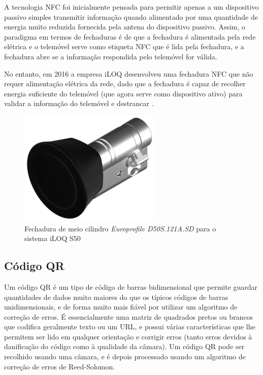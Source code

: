 \documentclass[11pt, a4paper, oneside]{book}
\begin{document}
A tecnologia NFC foi inicialmente pensada para permitir apenas a um dispositivo passivo simples transmitir informação quando alimentado por uma quantidade de energia muito reduzida fornecida pela antena do dispositivo passivo. Assim, o paradigma em termos de fechaduras é de que a fechadura é alimentada pela rede elétrica e o telemóvel serve como etiqueta NFC que é lida pela fechadura, e a fechadura abre se a informação respondida pelo telemóvel for válida.

No entanto, em 2016 a empresa iLOQ desenvolveu uma fechadura NFC que não requer alimentação elétrica da rede, dado que a fechadura é capaz de recolher energia suficiente do telemóvel (que agora serve como dispositivo ativo) para validar a informação do telemóvel e destrancar \cite{iloq-news, iloq-faq}.

\begin{figure}[ht]
  \centering
  \includegraphics[scale=0.50]{img/europrofile-half-cylinder-D50S-121A-SD.png}
  \caption{Fechadura de meio cilindro \textit{Europrofile D50S.121A.SD} para o sistema iLOQ S50 \cite{iloq-lock}}
\end{figure}

\subsection{Código QR}

Um código QR é um tipo de código de barras bidimensional que permite guardar quantidades de dados muito maiores do que os típicos códigos de barras unidimensionais, e de forma muito mais fiável por utilizar um algoritmo de correção de erros. É essencialmente uma matriz de quadrados pretos ou brancos que codifica geralmente texto ou um URL, e possui várias características que lhe permitem ser lido em qualquer orientação e corrigir erros (tanto erros devidos à danificação do código como à qualidade da câmara). Um código QR pode ser recolhido usando uma câmara, e é depois processado usando um algoritmo de correção de erros de Reed-Solomon.
\end{document}
